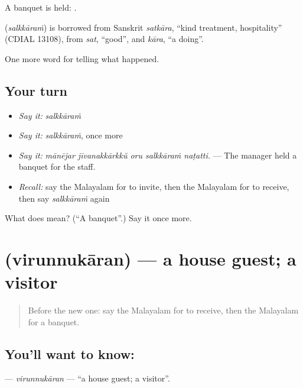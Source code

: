 A banquet is held:  .

\begin{cousinweb}
\textbf{} (\emph{salkkāraṁ}) is borrowed from Sanskrit \emph{satkāra}, \textquotedblleft{}kind treatment, hospitality\textquotedblright{} (CDIAL 13108), from \emph{sat}, \textquotedblleft{}good\textquotedblright{}, and \emph{kāra}, \textquotedblleft{}a doing\textquotedblright{}.
\end{cousinweb}

\begin{grammarlens}[title={What you've built}]
One more word for telling what happened.
\end{grammarlens}

\subsection*{Your turn}
\begin{itemize}
\raggedright
  \item \emph{Say it:} \emph{salkkāraṁ}
  \item \emph{Say it:} \emph{salkkāraṁ}, once more
  \item \emph{Say it:} \emph{mānējar jīvanakkārkkŭ oru salkkāraṁ naṭatti.} — The manager held a banquet for the staff.
  \item \emph{Recall:} say the Malayalam for to invite, then the Malayalam for to receive, then say \emph{salkkāraṁ} again
\end{itemize}

\begin{tcolorbox}[breakable,colback=teal!4,colframe=teal!35!black,title={Before you move on}]
What does  mean? (\textquotedblleft{}A banquet\textquotedblright{}.) Say it once more.
\end{tcolorbox}
\section[\texorpdfstring{\ml{വിരുന്നുകാരൻ} (virunnukāran)}{വിരുന്നുകാരൻ (virunnukāran)}]{ (virunnukāran) — a house guest; a visitor}

\label{lesson:ML-C387-virunnukaran}



\begin{quote}
Before the new one: say the Malayalam for to receive, then the Malayalam for a banquet.
\end{quote}

\subsection*{You'll want to know: }
\textbf{} — \emph{virunnukāran} — \textquotedblleft{}a house guest; a visitor\textquotedblright{}.

